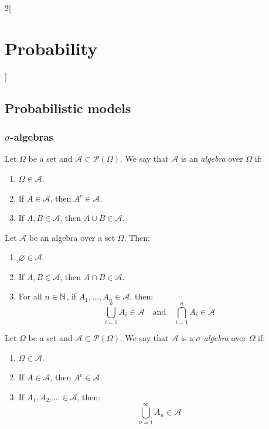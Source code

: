 \documentclass[../../../main_math.tex]{subfiles}
\begin{document}
\begin{multicols}{2}[\section{Probability}]
  \subsection{Probabilistic models}
  \subsubsection{\texorpdfstring{$\sigma$}{sigma}-algebras}
  \begin{definition}[Algebra]
    Let $\Omega$ be a set and $\mathcal{A}\subset\mathcal{P}(\Omega)$. We say that $\mathcal{A}$ is an \emph{algebra} over $\Omega$ if:
    \begin{enumerate}
      \item $\Omega\in\mathcal{A}$.
      \item If $A\in\mathcal{A}$, then $A^c\in\mathcal{A}$.
      \item If $A,B\in\mathcal{A}$, then $A\cup B\in\mathcal{A}$.
    \end{enumerate}
  \end{definition}
  \begin{proposition}
    Let $\mathcal{A}$ be an algebra over a set $\Omega$. Then:
    \begin{enumerate}
      \item $\varnothing\in\mathcal{A}$.
      \item If $A,B\in\mathcal{A}$, then $A\cap B\in\mathcal{A}$.
      \item For all $n\in\mathbb{N}$, if $A_1,\ldots,A_n\in\mathcal{A}$, then: $$\bigcup_{i=1}^nA_i\in\mathcal{A}\quad\text{and}\quad\bigcap_{i=1}^nA_i\in\mathcal{A}$$
    \end{enumerate}
  \end{proposition}
  \begin{definition}
    Let $\Omega$ be a set and $\mathcal{A}\subset\mathcal{P}(\Omega)$. We say that $\mathcal{A}$ is a \emph{$\sigma$-algebra} over $\Omega$ if:
    \begin{enumerate}
      \item $\Omega\in\mathcal{A}$.
      \item If $A\in\mathcal{A}$, then $A^c\in\mathcal{A}$.
      \item If $A_1,A_2,\ldots\in\mathcal{A}$, then: $$\bigcup_{n=1}^\infty A_n\in\mathcal{A}$$

\end{enumerate}
\end{definition}
\end{multicols}
\end{document}
